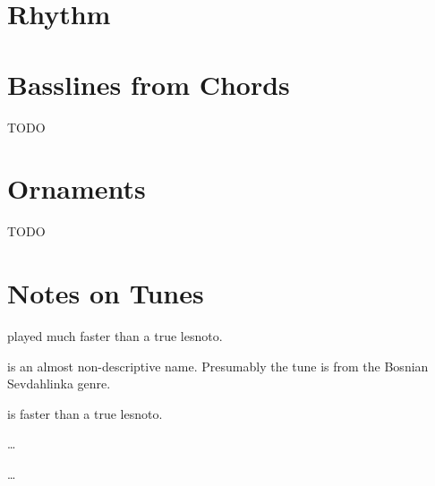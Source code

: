 
\section{Rhythm}
\begin{center}
\end{center}

\section{Basslines from Chords}
TODO

\section{Ornaments}
TODO

\section{Notes on Tunes}
\begin{description}[noitemsep]
\item[Ratevka] played much faster than a true lesnoto.
\item[Sevda] is an almost non-descriptive name.
	Presumably the tune is from the Bosnian Sevdahlinka
	genre.
\item[Četvorno Šopsko Horo] is faster than a true lesnoto.
\item[TODO] \dots
\item[TODO] \dots
\end{description}


